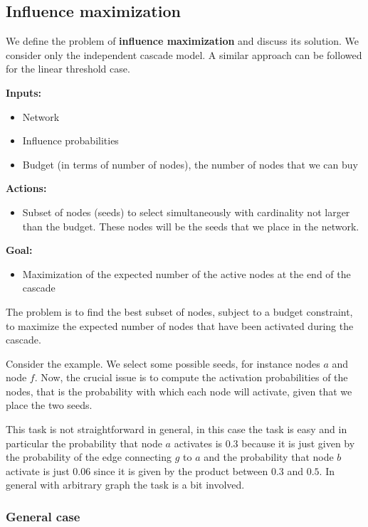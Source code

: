 \documentclass[10pt,a4paper]{article}
\begin{document}
\subsection{Influence maximization}\label{influence-maximization}

We define the problem of \textbf{influence maximization} and discuss its solution. We consider only the independent cascade model. A similar approach can be followed for the linear threshold case.

\textbf{Inputs:}
\begin{itemize}
\item Network
\item Influence probabilities
\item Budget (in terms of number of nodes), the number of nodes that we can buy
\end{itemize}

\textbf{Actions:}
\begin{itemize}
\item Subset of nodes (seeds) to select simultaneously with cardinality not larger than the budget. These nodes will be the seeds that we place in the network.
\end{itemize}

\textbf{Goal:}
\begin{itemize}
\item Maximization of the expected number of the active nodes at the end of the cascade
\end{itemize}

The problem is to find the best subset of nodes, subject to a budget constraint, to maximize the expected number of nodes that have been activated during the cascade.

Consider the example. We select some possible seeds, for instance nodes $a$ and node $f$. Now, the crucial issue is to compute the activation probabilities of the nodes, that is the probability with which each node will activate, given that we place the two seeds.

This task is not straightforward in general, in this case the task is easy and in particular the probability that node $a$ activates is $0.3$ because it is just given by the probability of the edge connecting $g$ to $a$ and the probability that node $b$ activate is just $0.06$ since it is given by the product between $0.3$ and
$0.5$. In general with arbitrary graph the task is a bit involved.

\subsubsection{General case}\label{general-case}
\end{document}
